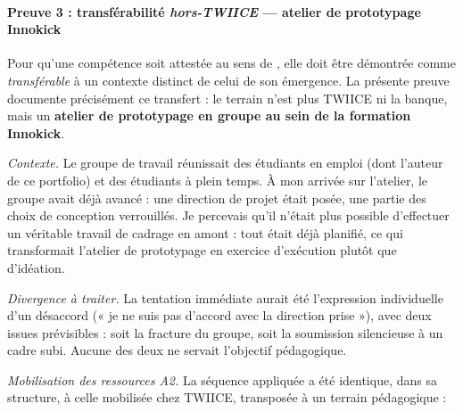 \paragraph{Preuve 3 : transférabilité \textit{hors-TWIICE} --- atelier de prototypage Innokick}

Pour qu'une compétence soit attestée au sens de \citet{tardif2006}, elle doit être démontrée comme \emph{transférable} à un contexte distinct de celui de son émergence. La présente preuve documente précisément ce transfert : le terrain n'est plus TWIICE ni la banque, mais un \textbf{atelier de prototypage en groupe au sein de la formation Innokick}.

\textit{Contexte.} Le groupe de travail réunissait des étudiants en emploi (dont l'auteur de ce portfolio) et des étudiants à plein temps. À mon arrivée sur l'atelier, le groupe avait déjà avancé : une direction de projet était posée, une partie des choix de conception verrouillés. Je percevais qu'il n'était plus possible d'effectuer un véritable travail de cadrage en amont : tout était déjà planifié, ce qui transformait l'atelier de prototypage en exercice d'exécution plutôt que d'idéation.

\textit{Divergence à traiter.} La tentation immédiate aurait été l'expression individuelle d'un désaccord (« je ne suis pas d'accord avec la direction prise »), avec deux issues prévisibles : soit la fracture du groupe, soit la soumission silencieuse à un cadre subi. Aucune des deux ne servait l'objectif pédagogique.

\textit{Mobilisation des ressources A2.} La séquence appliquée a été identique, dans sa structure, à celle mobilisée chez TWIICE, transposée à un terrain pédagogique :

